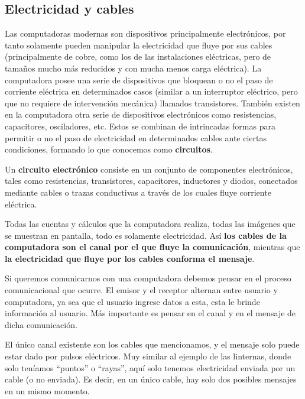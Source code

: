 \subsection{Electricidad y cables}

Las computadoras modernas son dispositivos principalmente electrónicos, por
tanto solamente pueden manipular la electricidad que fluye por sus cables
(principalmente de cobre, como los de las instalaciones eléctricas, pero de
tamaños mucho más reducidos y con mucha menos carga eléctrica). La computadora
posee una serie de dispositivos que bloquean o no el paso de corriente eléctrica
en determinados casos (similar a un interruptor eléctrico, pero que no requiere
de intervención mecánica) llamados transistores. También existen en la
computadora otra serie de dispositivos electrónicos como resistencias,
capacitores, osciladores, etc. Estos se combinan de intrincadas formas para
permitir o no el paso de electricidad en determinados cables ante ciertas
condiciones, formando lo que conocemos como \textbf{circuitos}.

\begin{definition} Un
    \textbf{circuito electrónico} consiste en un conjunto de componentes
    electrónicos, tales como resistencias, transistores, capacitores, inductores
    y diodos, conectados mediante cables o trazas conductivas a través de los
    cuales fluye corriente eléctrica.
\end{definition}

Todas las cuentas y cálculos que la computadora realiza, todas las imágenes que
se muestran en pantalla, todo es solamente electricidad. Así \textbf{los cables
de la computadora son el canal por el que fluye la comunicación}, mientras que
\textbf{la electricidad que fluye por los cables conforma el mensaje}.

Si queremos comunicarnos con una computadora debemos pensar en el proceso
comunicacional que ocurre. El emisor y el receptor alternan entre usuario y
computadora, ya sea que el usuario ingrese datos a esta, esta le brinde
información al usuario. Más importante es pensar en el canal y en el mensaje de
dicha comunicación.

El único canal existente son los cables que mencionamos, y el mensaje solo puede
estar dado por pulsos eléctricos. Muy similar al ejemplo de las linternas, donde
solo teníamos ``puntos'' o ``rayas'', aquí solo tenemos electricidad enviada por
un cable (o no enviada). Es decir, en un único cable, hay solo dos posibles
mensajes en un mismo momento.

